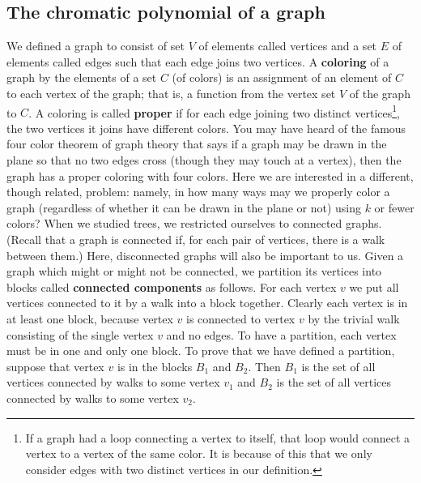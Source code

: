 \documentclass[10pt,]{book}
\newcommand{\terminology}[1]{\textbf{#1}}
\theoremstyle{plain}
\theoremstyle{definition}
\theoremstyle{definition}
\numberwithin{equation}{chapter}
\begin{document}
\subsection[{The chromatic polynomial of a graph}]{The chromatic polynomial of a graph}\label{subsection-57}
We defined a graph to consist of set \(V\) of elements called vertices and a set \(E\) of elements called edges such that each edge joins two vertices. A \terminology{coloring} of a graph by the elements of a set \(C\) (of colors) is an assignment of an element of \(C\) to each vertex of the graph; that is, a function from the vertex set \(V\) of the graph to \(C\). A coloring is called \terminology{proper} if for each edge joining two distinct vertices\footnote{If a graph had a loop connecting a vertex to itself, that loop would connect a vertex to a vertex of the same color.  It is because of this that we only consider edges with two distinct vertices in our definition.\label{fn-17}}, the two vertices it joins have different colors. You may have heard of the famous four color theorem of graph theory that says if a graph may be drawn in the plane so that no two edges cross (though they may touch at a vertex), then the graph has a proper coloring with four colors. Here we are interested in a different, though related, problem: namely, in how many ways may we properly color a graph (regardless of whether it can be drawn in the plane or not) using \(k\) or fewer colors? When we studied trees, we restricted ourselves to connected graphs. (Recall that a graph is connected if, for each pair of vertices, there is a walk between them.) Here, disconnected graphs will also be important to us. Given a graph which might or might not be connected, we partition its vertices into blocks called \terminology{connected components} as follows. For each vertex \(v\) we put all vertices connected to it by a walk into a block together. Clearly each vertex is in at least one block, because vertex \(v\) is connected to vertex \(v\) by the trivial walk consisting of the single vertex \(v\) and no edges. To have a partition, each vertex must be in one and only one block. To prove that we have defined a partition, suppose that vertex \(v\) is in the blocks \(B_1\) and \(B_2\). Then \(B_1\) is the set of all vertices connected by walks to some vertex \(v_1\) and \(B_2\) is the set of all vertices connected by walks to some vertex \(v_2\).%
\end{document}
